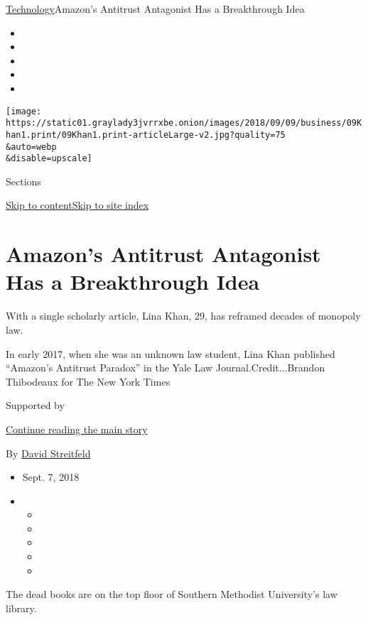 \href{/section/technology}{Technology}\textbar{}Amazon's Antitrust
Antagonist Has a Breakthrough Idea

\begin{itemize}
\item
\item
\item
\item
\item
\end{itemize}

\texttt{[image: https://static01.graylady3jvrrxbe.onion/images/2018/09/09/business/09Khan1.print/09Khan1.print-articleLarge-v2.jpg?quality=75\\\&auto=webp\\\&disable=upscale]}

Sections

\protect\hyperlink{site-content}{Skip to
content}\protect\hyperlink{site-index}{Skip to site index}

\hypertarget{amazons-antitrust-antagonist-has-a-breakthrough-idea}{%
\section{Amazon's Antitrust Antagonist Has a Breakthrough
Idea}\label{amazons-antitrust-antagonist-has-a-breakthrough-idea}}

With a single scholarly article, Lina Khan, 29, has reframed decades of
monopoly law.

In early 2017, when she was an unknown law student, Lina Khan published
``Amazon's Antitrust Paradox'' in the Yale Law Journal.Credit...Brandon
Thibodeaux for The New York Times

Supported by

\protect\hyperlink{after-sponsor}{Continue reading the main story}

By \href{https://www.nytimes3xbfgragh.onion/by/david-streitfeld}{David
Streitfeld}

\begin{itemize}
\item
  Sept. 7, 2018
\item
  \begin{itemize}
  \item
  \item
  \item
  \item
  \item
  \end{itemize}
\end{itemize}

The dead books are on the top floor of Southern Methodist University's
law library.

